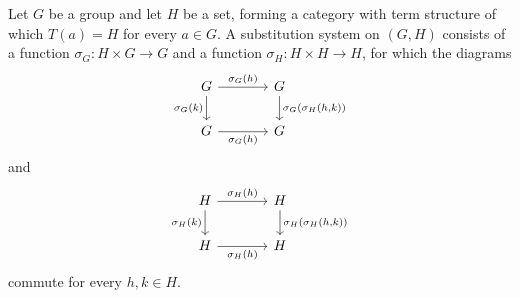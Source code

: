 \begin{eg}
Let $G$ be a group and let $H$ be a set, forming a category with term 
structure of which $T(a)=H$ for every $a\in G$. A substitution
system on $(G,H)$ consists of a function $\sigma_G : H\times G\to G$ and
a function $\sigma_H:H\times H\to H$, for which the diagrams
\begin{equation*}
\begin{tikzcd}[column sep=large]
G \arrow[r,"\sigma_G(h)"]
  \arrow[d,swap,"\sigma_G(k)"]
  &
G \arrow[d,"{\sigma_G(\sigma_H(h,k))}"]
  \\
G \arrow[r,swap,"\sigma_G(h)"] 
& G
\end{tikzcd}
\end{equation*}
and
\begin{equation*}
\begin{tikzcd}[column sep=large]
H \arrow[r,"\sigma_H(h)"]
  \arrow[d,swap,"\sigma_H(k)"]
  &
H \arrow[d,"{\sigma_H(\sigma_H(h,k))}"]
  \\
H \arrow[r,swap,"\sigma_H(h)"]
  &
H
\end{tikzcd}
\end{equation*}
commute for every $h,k\in H$. 
\end{eg}

